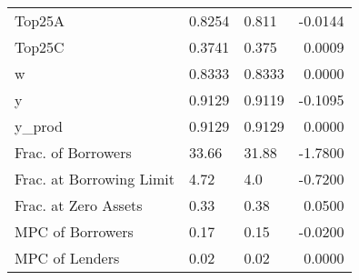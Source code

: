 \begin{table}
\begin{tabular}{lllr}
                  Top25A &  0.8254 &    0.811 & -0.0144 \\
                  Top25C &  0.3741 &    0.375 &  0.0009 \\
                       w &  0.8333 &   0.8333 &  0.0000 \\
                       y &  0.9129 &   0.9119 & -0.1095 \\
                  y\_prod &  0.9129 &   0.9129 &  0.0000 \\
      Frac. of Borrowers &   33.66 &    31.88 & -1.7800 \\
Frac. at Borrowing Limit &    4.72 &      4.0 & -0.7200 \\
    Frac. at Zero Assets &    0.33 &     0.38 &  0.0500 \\
        MPC of Borrowers &    0.17 &     0.15 & -0.0200 \\
          MPC of Lenders &    0.02 &     0.02 &  0.0000 \\
\bottomrule
\end{tabular}
\end{table}
